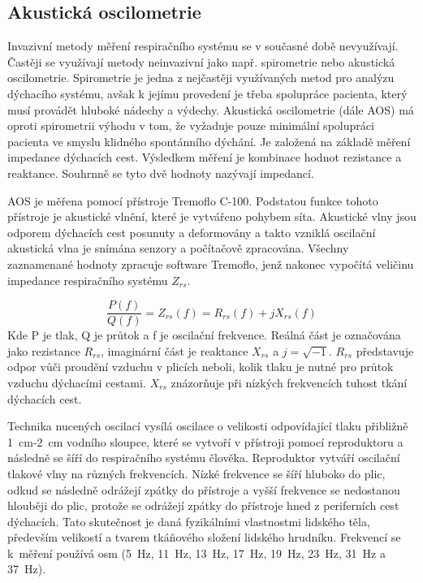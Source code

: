 \label{kap-metody}

\subsection {Akustická oscilometrie}
Invazivní metody měření respiračního systému se v současné době nevyužívají. Častěji se využívají metody neinvazivní jako např. spirometrie nebo akustická oscilometrie. Spirometrie je jedna z nejčastěji využívaných metod pro analýzu dýchacího systému, avšak k jejímu provedení je třeba spolupráce pacienta, který musí provádět hluboké nádechy a výdechy.
Akustická oscilometrie (dále AOS) má oproti spirometrii výhodu v tom, že vyžaduje pouze minimální spolupráci pacienta ve smyslu klidného spontánního dýchání. 
Je založená na základě měření impedance dýchacích cest. Výsledkem měření je kombinace hodnot rezistance a reaktance. Souhrnně se tyto dvě hodnoty nazývají impedancí. 

AOS je měřena pomocí přístroje Tremoflo C-100. Podstatou funkce tohoto přístroje je akustické vlnění, které je vytvářeno pohybem síta. Akustické vlny jsou odporem dýchacích cest posunuty a deformovány a takto vzniklá oscilační akustická vlna je snímána senzory a počítačově zpracována.
 Všechny zaznamenané hodnoty zpracuje software Tremoflo, jenž nakonec vypočítá veličinu impedance respiračního systému $Z_{rs}$. 

\begin{equation}
 \label{rce:1}
  \frac{P(f)}{Q(f)} = Z_{rs}(f) = R_{rs}(f) + j X_{rs}(f) 
\end{equation}
Kde P je tlak, Q je průtok a f je oscilační frekvence. 
Reálná část je označována jako rezistance $R_{rs}$, imaginární část je reaktance $X_{rs}$ a $j = \sqrt{-1}$. 
$R_{rs}$ představuje odpor vůči proudění vzduchu v plicích neboli, kolik tlaku je nutné pro průtok vzduchu dýchacími cestami. $X_{rs}$ znázorňuje při nízkých frekvencích tuhost tkání dýchacích cest.  \cite{Vlcek2018}


Technika nucených oscilací vysílá oscilace o velikosti odpovídající tlaku přibližně \SI{1}{cm}-\SI{2}{cm} vodního sloupce, které se vytvoří v přístroji pomocí reproduktoru a následně se šíří do respiračního systému člověka. Reproduktor vytváří oscilační tlakové vlny na různých frekvencích. Nízké frekvence se šíří hluboko do plic, odkud se následně odrážejí zpátky do přístroje a vyšší frekvence se nedostanou hlouběji do plic, protože se  odrážejí zpátky do přístroje hned z periferních cest dýchacích. Tato skutečnost je daná fyzikálními vlastnostmi lidského těla, především velikostí a tvarem tkáňového složení lidského hrudníku. \cite{Vlcek2018} Frekvencí se k~měření používá osm (\SI{5}{Hz}, \SI{11}{Hz}, \SI{13}{Hz}, \SI{17}{Hz}, \SI{19}{Hz}, \SI{23}{Hz}, \SI{31}{Hz} a  \SI{37}{Hz}). 

